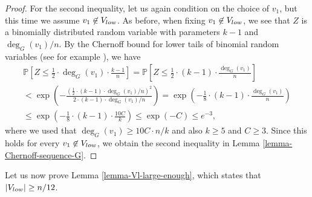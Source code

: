 \documentclass[11pt]{article}
\theoremstyle{definition}
\numberwithin{equation}{section}
\begin{document}
\begin{proof}
For the second inequality, let us again condition on the choice of $v_1$, but this time we assume $v_1\not\in V_{\textnormal{low}}$. As before, when fixing $v_1\not\in V_{\textnormal{low}}$, we see that $Z$ is a binomially distributed random variable with parameters $k-1$ and $\deg_G(v_1)/n$. By the Chernoff bound for lower tails of binomial random variables (see for example \cite[Corollary A.1.13]{alon-spencer}), we have
\begin{multline*}
\mathbb{P}\left[Z\leq \frac{1}{2}\cdot \deg_G(v_1)\cdot \frac{k-1}{n}\right] =
\mathbb{P}\left[Z\leq \frac{1}{2}\cdot (k-1) \cdot \frac{\deg_G(v_1)}{n}\right]\\
<\exp\left(-\frac{\left(\frac{1}{2}\cdot (k-1)\cdot \deg_G(v_1)/n\right)^2}{2\cdot (k-1)\cdot \deg_G(v_1)/n}\right)=\exp\left(-\frac{1}{8}\cdot (k-1)\cdot \frac{\deg_G(v_1)}{n}\right)\\
\leq \exp\left(-\frac{1}{8}\cdot (k-1)\cdot \frac{10C}{k}\right)\leq \exp\left(-C\right)\leq e^{-3},
\end{multline*}
where we used that $\deg_G(v_1)\geq 10C\cdot n/k$ and also $k\geq 5$ and $C\geq 3$. Since this holds for every $v_1\not\in V_{\textnormal{low}}$, we obtain the second inequality in Lemma \ref{lemma-Chernoff-sequence-G}.
\end{proof}

Let us now prove Lemma \ref{lemma-Vl-large-enough}, which states that $\vert V_{\textnormal{low}}\vert\geq n/12$.
\end{document}

